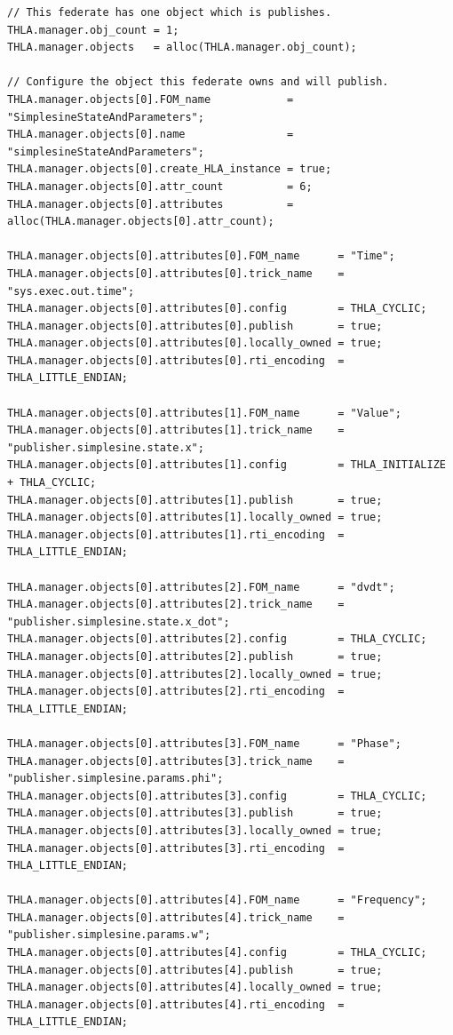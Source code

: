 \begin{lstlisting}[caption={{\tt SIM\_simplesine\_hla\_pub} input file},label={list:hla-pub-input}]
// This federate has one object which is publishes.
THLA.manager.obj_count = 1;
THLA.manager.objects   = alloc(THLA.manager.obj_count);

// Configure the object this federate owns and will publish.
THLA.manager.objects[0].FOM_name            = "SimplesineStateAndParameters";
THLA.manager.objects[0].name                = "simplesineStateAndParameters";
THLA.manager.objects[0].create_HLA_instance = true;
THLA.manager.objects[0].attr_count          = 6;
THLA.manager.objects[0].attributes          = alloc(THLA.manager.objects[0].attr_count);

THLA.manager.objects[0].attributes[0].FOM_name      = "Time";
THLA.manager.objects[0].attributes[0].trick_name    = "sys.exec.out.time";
THLA.manager.objects[0].attributes[0].config        = THLA_CYCLIC;
THLA.manager.objects[0].attributes[0].publish       = true;
THLA.manager.objects[0].attributes[0].locally_owned = true;
THLA.manager.objects[0].attributes[0].rti_encoding  = THLA_LITTLE_ENDIAN;

THLA.manager.objects[0].attributes[1].FOM_name      = "Value";
THLA.manager.objects[0].attributes[1].trick_name    = "publisher.simplesine.state.x";
THLA.manager.objects[0].attributes[1].config        = THLA_INITIALIZE + THLA_CYCLIC;
THLA.manager.objects[0].attributes[1].publish       = true;
THLA.manager.objects[0].attributes[1].locally_owned = true;
THLA.manager.objects[0].attributes[1].rti_encoding  = THLA_LITTLE_ENDIAN;

THLA.manager.objects[0].attributes[2].FOM_name      = "dvdt";
THLA.manager.objects[0].attributes[2].trick_name    = "publisher.simplesine.state.x_dot";
THLA.manager.objects[0].attributes[2].config        = THLA_CYCLIC;
THLA.manager.objects[0].attributes[2].publish       = true;
THLA.manager.objects[0].attributes[2].locally_owned = true;
THLA.manager.objects[0].attributes[2].rti_encoding  = THLA_LITTLE_ENDIAN;

THLA.manager.objects[0].attributes[3].FOM_name      = "Phase";
THLA.manager.objects[0].attributes[3].trick_name    = "publisher.simplesine.params.phi";
THLA.manager.objects[0].attributes[3].config        = THLA_CYCLIC;
THLA.manager.objects[0].attributes[3].publish       = true;
THLA.manager.objects[0].attributes[3].locally_owned = true;
THLA.manager.objects[0].attributes[3].rti_encoding  = THLA_LITTLE_ENDIAN;

THLA.manager.objects[0].attributes[4].FOM_name      = "Frequency";
THLA.manager.objects[0].attributes[4].trick_name    = "publisher.simplesine.params.w";
THLA.manager.objects[0].attributes[4].config        = THLA_CYCLIC;
THLA.manager.objects[0].attributes[4].publish       = true;
THLA.manager.objects[0].attributes[4].locally_owned = true;
THLA.manager.objects[0].attributes[4].rti_encoding  = THLA_LITTLE_ENDIAN;


\end{lstlisting}
